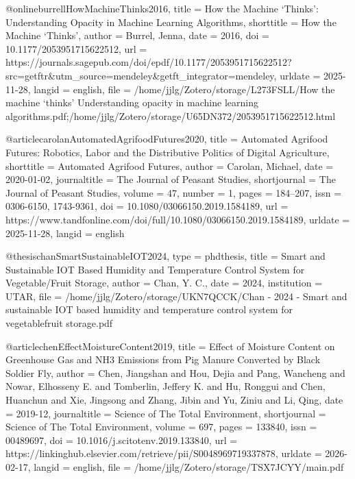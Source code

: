 {{{@online{burrellHowMachineThinks2016,
  title = {How the Machine ‘Thinks’: {{Understanding}} Opacity in Machine Learning Algorithms},
  shorttitle = {How the Machine ‘Thinks’},
  author = {Burrel, Jenna},
  date = {2016},
  doi = {10.1177/2053951715622512},
  url = {https://journals.sagepub.com/doi/epdf/10.1177/2053951715622512?src=getftr&utm_source=mendeley&getft_integrator=mendeley},
  urldate = {2025-11-28},
  langid = {english},
  file = {/home/jjlg/Zotero/storage/L273FSLL/How the machine ‘thinks’ Understanding opacity in machine learning algorithms.pdf;/home/jjlg/Zotero/storage/U65DN372/2053951715622512.html}
}

@article{carolanAutomatedAgrifoodFutures2020,
  title = {Automated Agrifood Futures: Robotics, Labor and the Distributive Politics of Digital Agriculture},
  shorttitle = {Automated Agrifood Futures},
  author = {Carolan, Michael},
  date = {2020-01-02},
  journaltitle = {The Journal of Peasant Studies},
  shortjournal = {The Journal of Peasant Studies},
  volume = {47},
  number = {1},
  pages = {184--207},
  issn = {0306-6150, 1743-9361},
  doi = {10.1080/03066150.2019.1584189},
  url = {https://www.tandfonline.com/doi/full/10.1080/03066150.2019.1584189},
  urldate = {2025-11-28},
  langid = {english}
}

@thesis{chanSmartSustainableIOT2024,
  type = {phdthesis},
  title = {Smart and Sustainable {{IOT}} Based Humidity and Temperature Control System for Vegetable/Fruit Storage},
  author = {Chan, Y. C.},
  date = {2024},
  institution = {UTAR},
  file = {/home/jjlg/Zotero/storage/UKN7QCCK/Chan - 2024 - Smart and sustainable IOT based humidity and temperature control system for vegetablefruit storage.pdf}
}

@article{chenEffectMoistureContent2019,
  title = {Effect of Moisture Content on Greenhouse Gas and {{NH3}} Emissions from Pig Manure Converted by Black Soldier Fly},
  author = {Chen, Jiangshan and Hou, Dejia and Pang, Wancheng and Nowar, Elhosseny E. and Tomberlin, Jeffery K. and Hu, Ronggui and Chen, Huanchun and Xie, Jingsong and Zhang, Jibin and Yu, Ziniu and Li, Qing},
  date = {2019-12},
  journaltitle = {Science of The Total Environment},
  shortjournal = {Science of The Total Environment},
  volume = {697},
  pages = {133840},
  issn = {00489697},
  doi = {10.1016/j.scitotenv.2019.133840},
  url = {https://linkinghub.elsevier.com/retrieve/pii/S0048969719337878},
  urldate = {2026-02-17},
  langid = {english},
  file = {/home/jjlg/Zotero/storage/TSX7JCYY/main.pdf}
}

}}}
